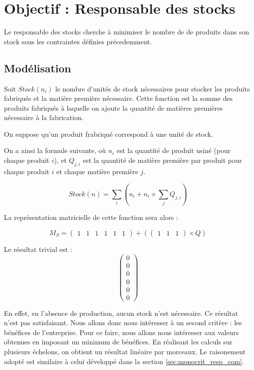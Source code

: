 \newpage
\section{Objectif : Responsable des stocks}
\label{stocks}
Le responsable des stocks cherche à minimiser le nombre de de produits dans
son stock sous les contraintes définies précedemment.

\subsection{Modélisation}
Soit $Stock(n_{i})$ le nombre d'unités de stock nécessaires pour stocker les
produits fabriqués et la matière première nécessaire. Cette fonction est la
somme des produits fabriqués à laquelle on ajoute la quantité de matières
premières nécessaire à la fabrication.

On suppose qu'un produit frabriqué correspond à une unité de stock.

On a ainsi la formule suivante, où $n_{i}$ est la quantité de produit usiné
(pour chaque produit $i$), et $Q_{j,i}$ est la quantité de matière première
par produit pour chaque produit $i$ et chaque matière première $j$.

\begin{equation}
	Stock(n) = \sum_{i} (n_{i} + n_{i} \times \sum_{j} Q_{j,i})
\end{equation}

La représentation matricielle de cette fonction sera alors :

\begin{equation}
	M_S = \begin{pmatrix}
		1 & 1 & 1 & 1 & 1 & 1
	\end{pmatrix} + (
	\begin{pmatrix}
		1 & 1 & 1
	\end{pmatrix}
	\times Q)
\end{equation}

Le résultat trivial est :
\begin{equation}
    \begin{pmatrix}
	0 \\ 0 \\ 0 \\ 0 \\ 0 \\ 0
    \end{pmatrix}
\end{equation}

En effet, en l'absence de production, aucun stock n'est nécessaire. Ce résultat
n'est pas satisfaisant. Nous allons donc nous intéresser à un second critère :
les bénéfices de l'entreprise. Pour ce faire, nous allons nous intéresser aux
valeurs obtenues en imposant un minimum de bénéfices. En réalisant les calculs
sur plusieurs échelons, on obtient un résultat linéaire par morceaux. Le
raisonement adopté est similaire à celui développé dans la section
\ref{sec:monocrit_resp_com}.

